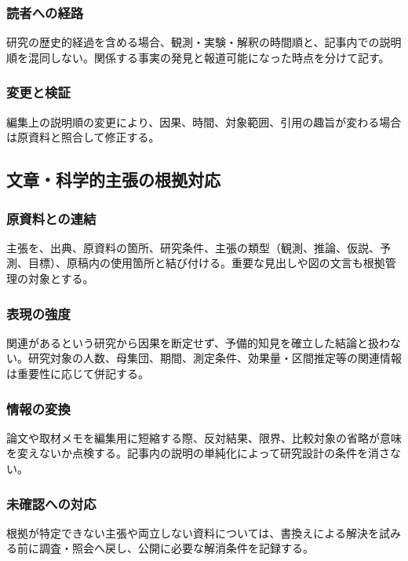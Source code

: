 \documentclass[a4paper,11pt]{article}
\begin{document}
\subsubsection{読者への経路}
\par 研究の歴史的経過を含める場合、観測・実験・解釈の時間順と、記事内での説明順を混同しない。関係する事実の発見と報道可能になった時点を分けて記す。\par\medskip
\subsubsection{変更と検証}
\par 編集上の説明順の変更により、因果、時間、対象範囲、引用の趣旨が変わる場合は原資料と照合して修正する。\par\medskip
\subsection{文章・科学的主張の根拠対応}
\subsubsection{原資料との連結}
\par 主張を、出典、原資料の箇所、研究条件、主張の類型（観測、推論、仮説、予測、目標）、原稿内の使用箇所と結び付ける。重要な見出しや図の文言も根拠管理の対象とする。\par\medskip
\subsubsection{表現の強度}
\par 関連があるという研究から因果を断定せず、予備的知見を確立した結論と扱わない。研究対象の人数、母集団、期間、測定条件、効果量・区間推定等の関連情報は重要性に応じて併記する。\par\medskip
\subsubsection{情報の変換}
\par 論文や取材メモを編集用に短縮する際、反対結果、限界、比較対象の省略が意味を変えないか点検する。記事内の説明の単純化によって研究設計の条件を消さない。\par\medskip
\subsubsection{未確認への対応}
\par 根拠が特定できない主張や両立しない資料については、書換えによる解決を試みる前に調査・照会へ戻し、公開に必要な解消条件を記録する。\par\medskip
\end{document}
